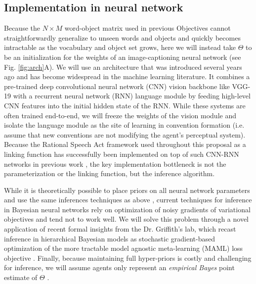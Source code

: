 \subsection{Implementation in neural network}
Because the $N \times M$ word-object matrix used in previous Objectives cannot straightforwardly generalize to unseen words and objects and quickly becomes intractable as the vocabulary and object set grows, here we will instead take $\Theta$ to be an initialization for the weights of an image-captioning neural network (see Fig. \ref{fig:arch}A).
We will use an architecture that was introduced several years ago  and has become widespread in the machine learning literature.
It combines a pre-trained deep convolutional neural network (CNN) vision backbone like VGG-19 with a recurrent neural network (RNN) language module by feeding high-level CNN features into the initial hidden state of the RNN. 
While these systems are often trained end-to-end, we will freeze the weights of the vision module and isolate the language module as the site of learning in convention formation (i.e. assume that new conventions are not modifying the agent's perceptual system).
Because the Rational Speech Act framework used throughout this proposal as a linking function %
has successfully been implemented on top of such CNN-RNN networks in previous work , the key implementation bottleneck is not the parameterization or the linking function, but the inference algorithm.

While it is theoretically possible to place priors on all neural network parameters and use the same inferences techniques as above  , current techniques for inference in Bayesian neural networks rely on optimization of noisy gradients of variational objectives and tend not to work well. 
We will solve this problem through a novel application of recent formal insights from the Dr. Griffith's lab, which recast inference in hierarchical Bayesian models as stochastic gradient-based optimization of the more tractable model agnostic meta-learning (MAML) loss objective \cite{grant_recasting_2018}.
Finally, because maintaining full hyper-priors is costly and challenging for inference, we will assume agents only represent an \emph{empirical Bayes} point estimate of $\Theta$ \cite{gelman_bayesian_2014}.
